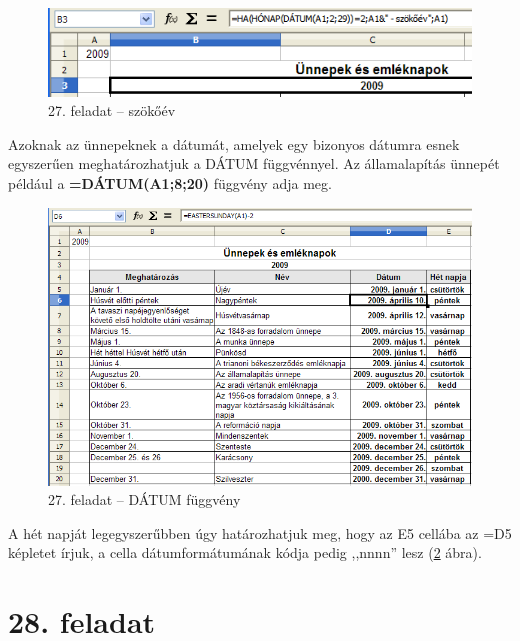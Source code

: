 \begin{figure}[!h]
\begin{center}
\includegraphics[width=13.783cm]{oocalcv2-img122.png}
\caption{27.  feladat --  szökőév}\label{27-feladatSzökőév}
\end{center}
\end{figure}

Azoknak az ünnepeknek a dátumát, amelyek egy bizonyos dátumra
esnek egyszerűen meghatározhatjuk a DÁTUM függvénnyel. Az
államalapítás ünnepét például a
{\sffamily\bfseries{=DÁTUM(A1;8;20)}} függvény adja meg.

\begin{figure}[!h]
\begin{center}
\includegraphics[width=15.999cm]{oocalcv2-img123.png}
\caption{27.  feladat -- DÁTUM függvény}\label{27-feladatDateFüggvény}
\end{center}
\end{figure}

A hét napját legegyszerűbben úgy határozhatjuk meg, hogy az
E5 cellába az =D5 képletet írjuk, a cella dátumformátumának
kódja pedig ,,nnnn'' lesz (\ref{27-feladatDateFüggvény} ábra). 


\section{28. feladat}

